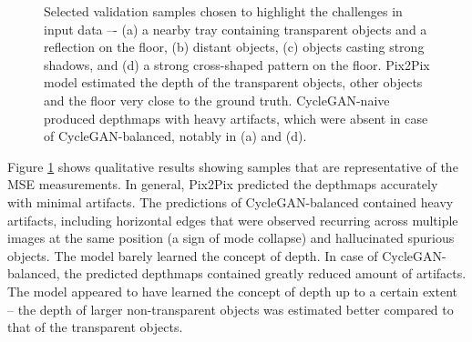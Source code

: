 \begin{figure}[h!]
    \centering
    \caption{Selected validation samples chosen to highlight the challenges in input data –- (a) a nearby tray containing transparent objects and a reflection on the floor, (b) distant objects, (c) objects casting strong shadows, and (d) a strong cross-shaped pattern on the floor. Pix2Pix model estimated the depth of the transparent objects, other objects and the floor very close to the ground truth. CycleGAN-naive produced depthmaps with heavy artifacts, which were absent in case of CycleGAN-balanced, notably in (a) and (d).}
    \label{fig:cleargrasp_qual}
\end{figure}

Figure \ref{fig:cleargrasp_qual} shows qualitative results showing samples that are representative of the MSE measurements. In general, Pix2Pix predicted the depthmaps accurately with minimal artifacts. The predictions of CycleGAN-balanced contained heavy artifacts, including horizontal edges that were observed recurring across multiple images at the same position (a sign of mode collapse) and hallucinated spurious objects. The model barely learned the concept of depth. In case of CycleGAN-balanced, the predicted depthmaps contained greatly reduced amount of artifacts. The model appeared to have learned the concept of depth up to a certain extent -- the depth of larger non-transparent objects was estimated better compared to that of the transparent objects.

